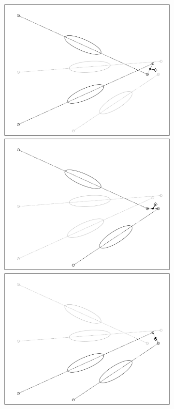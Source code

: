 \begin{figure}
\begin{subfigure}{0.45\textwidth}
    \end{subfigure}
    \begin{subfigure}{0.45\textwidth}
        \includegraphics[width=0.8\linewidth]{Plots/stereo_magic_4.pdf}
        \includegraphics[width=0.8\linewidth]{Plots/stereo_magic_5.pdf} 
        \includegraphics[width=0.8\linewidth]{Plots/stereo_magic_6.pdf} 

\end{subfigure}
\end{figure}
